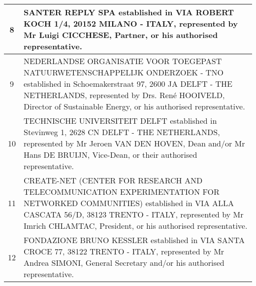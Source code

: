 \begin{longtable}{|c|p{14.5cm}|}
8 &	SANTER REPLY SPA established in VIA ROBERT KOCH 1/4, 20152 MILANO - ITALY, represented by Mr Luigi CICCHESE, Partner, or his authorised representative. \\ \hline
9 &	NEDERLANDSE ORGANISATIE VOOR TOEGEPAST NATUURWETENSCHAPPELIJK ONDERZOEK - TNO established in Schoemakerstraat 97, 2600 JA DELFT - THE NETHERLANDS, represented by Drs. Ren\'{e} HOOIVELD, Director of Sustainable
Energy, or his authorised representative. \\ \hline
10 &	TECHNISCHE UNIVERSITEIT DELFT established in Stevinweg 1, 2628 CN DELFT - THE NETHERLANDS, represented by Mr Jeroen VAN DEN HOVEN, Dean and/or Mr Hans DE BRUIJN, Vice-Dean, or their authorised representative. \\ \hline
11 &	CREATE-NET (CENTER FOR RESEARCH AND TELECOMMUNICATION
EXPERIMENTATION FOR NETWORKED COMMUNITIES) established in VIA ALLA CASCATA 56/D, 38123 TRENTO - ITALY, represented by Mr Imrich CHLAMTAC, President, or his authorised representative. \\ \hline
12 &	FONDAZIONE BRUNO KESSLER established in VIA SANTA CROCE 77, 38122
TRENTO - ITALY, represented by Mr Andrea SIMONI, General Secretary and/or his authorised representative. \\ \hline
\end{longtable}



